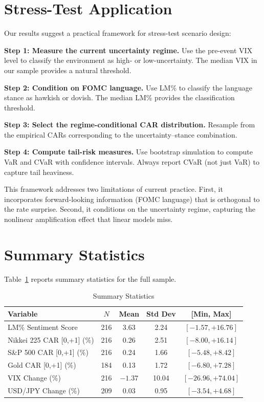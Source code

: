 \documentclass[11pt]{article}
\begin{document}
\section{Stress-Test Application}

Our results suggest a practical framework for stress-test scenario design:

\textbf{Step 1: Measure the current uncertainty regime.} Use the pre-event VIX level to classify the environment as high- or low-uncertainty. The median VIX in our sample provides a natural threshold.

\textbf{Step 2: Condition on FOMC language.} Use LM\% to classify the language stance as hawkish or dovish. The median LM\% provides the classification threshold.

\textbf{Step 3: Select the regime-conditional CAR distribution.} Resample from the empirical CARs corresponding to the uncertainty--stance combination.

\textbf{Step 4: Compute tail-risk measures.} Use bootstrap simulation to compute VaR and CVaR with confidence intervals. Always report CVaR (not just VaR) to capture tail heaviness.

This framework addresses two limitations of current practice. First, it incorporates forward-looking information (FOMC language) that is orthogonal to the rate surprise. Second, it conditions on the uncertainty regime, capturing the nonlinear amplification effect that linear models miss.

\section{Summary Statistics}

Table~\ref{tab:sumstats} reports summary statistics for the full sample.

\begin{table}[htbp]
\centering
\caption{Summary Statistics}
\label{tab:sumstats}
\begin{tabular}{lcccc}
\toprule
Variable & $N$ & Mean & Std Dev & [Min, Max] \\
\midrule
LM\% Sentiment Score    & 216 & 3.63  & 2.24 & $[-1.57, +16.76]$ \\
Nikkei 225 CAR [0,+1] (\%) & 216 & 0.26  & 2.51 & $[-8.00, +16.14]$ \\
S\&P 500 CAR [0,+1] (\%)   & 216 & 0.24  & 1.66 & $[-5.48, +8.42]$ \\
Gold CAR [0,+1] (\%)       & 184 & 0.13  & 1.72 & $[-6.80, +7.28]$ \\
VIX Change (\%)            & 216 & $-1.37$ & 10.04 & $[-26.96, +74.04]$ \\
USD/JPY Change (\%)        & 209 & 0.03  & 0.95 & $[-3.54, +4.68]$ \\
\bottomrule
\end{tabular}
\end{table}
\end{document}
